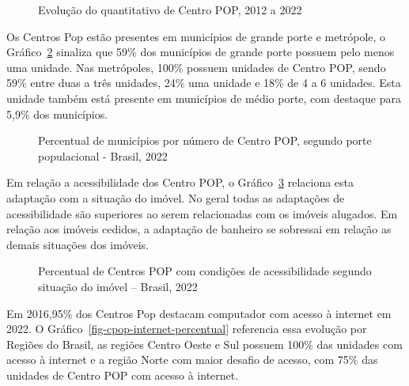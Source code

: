\documentclass[
  letterpaper,
  DIV=11,
  numbers=noendperiod]{scrreprt}
\begin{document}
\begin{figure}


\caption{\label{fig-quantitativo-CentroPop}Evolução do quantitativo de
Centro POP, 2012 a 2022}

\end{figure}%

Os Centros Pop estão presentes em municípios de grande porte e
metrópole, o Gráfico~\ref{fig-cpop-porte} sinaliza que 59\% dos
municípios de grande porte possuem pelo menos uma unidade. Nas
metrópoles, 100\% possuem unidades de Centro POP, sendo 59\% entre duas
a três unidades, 24\% uma unidade e 18\% de 4 a 6 unidades. Esta unidade
também está presente em municípios de médio porte, com destaque para
5,9\% dos municípios.

\begin{figure}


\caption{\label{fig-cpop-porte}Percentual de municípios por número de
Centro POP, segundo porte populacional - Brasil, 2022}

\end{figure}%

Em relação a acessibilidade dos Centro POP, o
Gráfico~\ref{fig-cpop-acessibilidade-situacao} relaciona esta adaptação
com a situação do imóvel. No geral todas as adaptações de acessibilidade
são superiores ao serem relacionadas com os imóveis alugados. Em relação
aos imóveis cedidos, a adaptação de banheiro se sobressai em relação as
demais situações dos imóveis.

\begin{figure}


\caption{\label{fig-cpop-acessibilidade-situacao}Percentual de Centros
POP com condições de acessibilidade segundo situação do imóvel --
Brasil, 2022}

\end{figure}%

Em 2016,95\% dos Centros Pop destacam computador com acesso à internet
em 2022. O Gráfico~\ref{fig-cpop-internet-percentual} referencia essa
evolução por Regiões do Brasil, as regiões Centro Oeste e Sul possuem
100\% das unidades com acesso à internet e a região Norte com maior
desafio de acesso, com 75\% das unidades de Centro POP com acesso à
internet.
\end{document}
